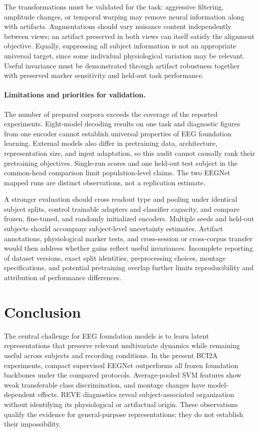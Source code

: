 \documentclass{article}
\begin{document}
The transformations must be validated for the task: aggressive filtering,
amplitude changes, or temporal warping may remove neural information along
with artifacts. Augmentations should vary nuisance content independently
between views; an artifact preserved in both views can itself satisfy the
alignment objective. Equally, suppressing all subject information is not
an appropriate universal target, since some individual physiological
variation may be relevant. Useful invariance must be demonstrated through
artifact robustness together with preserved marker sensitivity and
held-out task performance.

\paragraph{Limitations and priorities for validation.}
The number of prepared corpora exceeds the coverage of the reported
experiments. Eight-model decoding results on one task and diagnostic
figures from one encoder cannot establish universal properties of EEG
foundation learning. External models also differ in pretraining data,
architecture, representation size, and input adaptation, so this audit
cannot causally rank their pretraining objectives. Single-run scores and
one held-out test subject in the common-head comparison limit population-level
claims. The two EEGNet mapped runs are distinct observations, not a
replication estimate.

A stronger evaluation should cross readout type and pooling under identical
subject splits, control trainable adapters and classifier capacity, and
compare frozen, fine-tuned, and randomly initialized encoders. Multiple
seeds and held-out subjects should accompany subject-level uncertainty
estimates. Artifact annotations, physiological marker tests, and
cross-session or cross-corpus transfer would then address whether gains
reflect useful invariances. Incomplete reporting of dataset versions, exact split identities,
preprocessing choices, montage specifications, and potential pretraining
overlap further limits reproducibility and attribution of performance
differences.

\balance
\section{Conclusion}
\label{sec:conclusion}

The central challenge for EEG foundation models is to learn latent
representations that preserve relevant multivariate dynamics while
remaining useful across subjects and recording conditions. In the present
BCI2A experiments, compact supervised EEGNet outperforms all frozen
foundation backbones under the compared protocols. Average-pooled SVM
features show weak transferable class discrimination, and montage changes
have model-dependent effects. REVE diagnostics reveal subject-associated
organization without identifying its physiological or artifactual origin.
These observations qualify the evidence for general-purpose representations;
they do not establish their impossibility.
\end{document}
